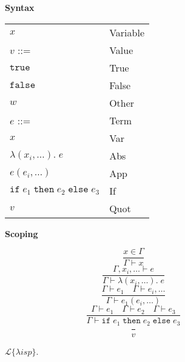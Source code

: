 \documentclass[a4paper]{article}
\newcommand{\lisp}{\ensuremath{\mathcal{L}\{\lambda isp\}}}
\begin{document}
\begin{figure}[h]
\label{fig:lisp}
\caption{\lisp.}

\begin{multicols}{2}
{\bf Syntax}

\begin{tabular}{ll}
$x$ & Variable \\
$v$ ::= & Value \\
\hspace{1em} $\mathtt{true}$ & \hspace{1em} True \\
\hspace{1em} $\mathtt{false}$ & \hspace{1em} False \\
\hspace{1em} $w$ & \hspace{1em} Other \\
$e$ ::= & Term \\
\hspace{1em} $x$ & \hspace{1em} Var \\
\hspace{1em} $\lambda(x_i, \dotsc).\;e$ & \hspace{1em} Abs \\
\hspace{1em} $e(e_i, \dotsc)$ & \hspace{1em} App \\
\hspace{1em} $\mathtt{if}\;e_1\;\mathtt{then}\;e_2\;\mathtt{else}\;e_3$ & \hspace{1em} If \\
\hspace{1em} $v$ & \hspace{1em} Quot \\
\end{tabular}

\columnbreak

{\bf Scoping}

$$\frac{x \in \Gamma}{\Gamma \vdash x}$$
$$\frac{\Gamma, x_i, \dotsc \vdash e}{\Gamma \vdash \lambda(x_i, \dotsc).\;e}$$
$$\frac{\Gamma \vdash e_1 \quad \Gamma \vdash e_i, \dotsc}{\Gamma \vdash e_1(e_i, \dotsc)}$$
$$\frac{\Gamma \vdash e_1 \quad \Gamma \vdash e_2 \quad \Gamma \vdash e_3}{\Gamma \vdash \mathtt{if}\;e_1\;\mathtt{then}\;e_2\;\mathtt{else}\;e_3}$$
$$\frac{}{v}$$

\vspace{-13pt}
\mbox{}


\end{multicols}
\end{figure}
\end{document}
